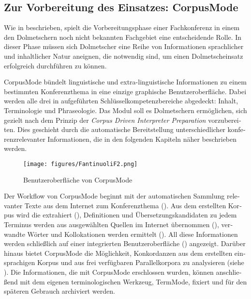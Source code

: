 \documentclass[output=paper]{LSP/langsci}
\begin{document}
\begin{otherlanguage}{ngerman}
\subsection{Zur Vorbereitung des Einsatzes: CorpusMode}\label{sec:fantinuoli:6.1}

Wie in  beschrieben, spielt die Vorbereitungsphase einer Fachkonferenz in einem den Dolmetschern noch nicht bekannten Fachgebiet eine entscheidende Rolle. In dieser Phase müssen sich Dolmetscher eine Reihe von Informationen sprachlicher und inhaltlicher Natur aneignen, die notwendig sind, um einen Dolmetscheinsatz erfolgreich durchführen zu können.

CorpusMode bündelt linguistische und extra-linguistische Informationen zu einem bestimmten Konferenzthema in eine einzige graphische Benutzeroberfläche. Dabei werden alle drei in  aufgeführten Schlüsselkompetenzbereiche abgedeckt: Inhalt, Terminologie und Phraseologie. Das Modul soll es Dolmetschern ermöglichen, sich gezielt nach dem Prinzip der \textit{Corpus Driven Interpreter Preparation} \citep{Fantinuoli2006} vorzubereiten. Dies geschieht durch die automatische Bereitstellung unterschiedlicher konferenzrelevanter Informationen, die in den folgenden Kapiteln näher beschrieben werden.

\begin{figure}
\texttt{[image: figures/FantinuoliF2.png]}
\caption{Benutzeroberfläche von CorpusMode}
\label{fig:fantinuoli:2}
\end{figure} 

Der Workflow von CorpusMode beginnt mit der automatischen Sammlung relevanter Texte aus dem Internet zum Konferenzthema (). Aus dem erstellten Korpus wird die  extrahiert (), Definitionen und Übersetzungskandidaten zu jedem Terminus werden aus ausgewählten Quellen im Internet übernommen (), verwandte Wörter und Kollokationen werden ermittelt (). All diese Informationen werden schließlich auf einer integrierten Benutzeroberfläche () angezeigt. Darüber hinaus bietet CorpusMode die Möglichkeit, Konkordanzen aus dem erstellten einsprachigen Korpus und aus frei verfügbaren Parallelkorpora zu analysieren (siehe ). Die Informationen, die mit CorpusMode erschlossen wurden, können anschließend mit dem eigenen terminologischen Werkzeug, TermMode, fixiert und für den späteren Gebrauch archiviert werden. 


\end{otherlanguage}
\end{document}
